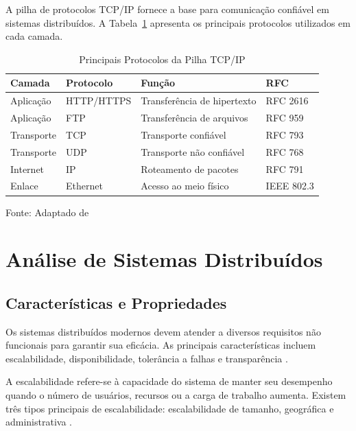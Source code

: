 A pilha de protocolos TCP/IP fornece a base para comunicação confiável em sistemas distribuídos. A Tabela~\ref{tab:protocolos} apresenta os principais protocolos utilizados em cada camada.

\begin{table}[H]
\centering
  \caption{Principais Protocolos da Pilha TCP/IP}
  \begin{tabular}{|l|l|l|l|}
      \hline
      \textbf{Camada} & \textbf{Protocolo} & \textbf{Função} & \textbf{RFC} \\
      \hline
      Aplicação & HTTP/HTTPS & Transferência de hipertexto & RFC 2616 \\
      \hline
      Aplicação & FTP & Transferência de arquivos & RFC 959 \\
      \hline
      Transporte & TCP & Transporte confiável & RFC 793 \\
      \hline
      Transporte & UDP & Transporte não confiável & RFC 768 \\
      \hline
      Internet & IP & Roteamento de pacotes & RFC 791 \\
      \hline
      Enlace & Ethernet & Acesso ao meio físico & IEEE 802.3 \\
      \hline
  \end{tabular}
  \label{tab:protocolos}
  \flushleft %

  {\fontsize{10pt}{\baselineskip}\selectfont
    Fonte: Adaptado de }
\end{table}


\section{Análise de Sistemas Distribuídos}

\subsection{Características e Propriedades}

Os sistemas distribuídos modernos devem atender a diversos requisitos não funcionais para garantir sua eficácia. As principais características incluem escalabilidade, disponibilidade, tolerância a falhas e transparência \cite{coulouris2013sistemas}.

A escalabilidade refere-se à capacidade do sistema de manter seu desempenho quando o número de usuários, recursos ou a carga de trabalho aumenta. Existem três tipos principais de escalabilidade: escalabilidade de tamanho, geográfica e administrativa \cite{tanenbaum2016sistemas}.

